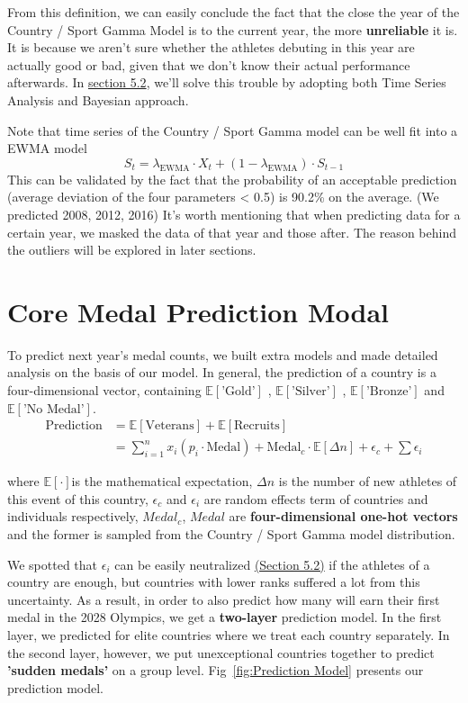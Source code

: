 \documentclass{mcmthesis}
\begin{document}
From this definition, we can easily conclude the fact that the close the year of the Country / Sport Gamma Model is to the current year, the more \textbf{unreliable} it is. It is because we aren't sure whether the athletes debuting in this year are actually good or bad, given that we don't know their actual performance afterwards. In \hyperref[sec:5.2]{section 5.2}, we'll solve this trouble by adopting both Time Series Analysis and Bayesian approach.

Note that time series of the Country / Sport Gamma model can be well fit into a EWMA model\cite{5}\cite{6}$$S_t = \lambda_{\text{EWMA}} \cdot X_t + (1 - \lambda_{\text{EWMA}}) \cdot S_{t-1}$$This can be validated by the fact that the probability of an acceptable prediction (average deviation of the four parameters < 0.5) is 90.2\% on the average. (We predicted 2008, 2012, 2016) It's worth mentioning that when predicting data for a certain year, we masked the data of that year and those after. The reason behind the outliers will be explored in later sections.

\section{Core Medal Prediction Modal}
To predict next year's medal counts, we built extra models and made detailed analysis on the basis of our model. 
In general, the prediction of a country is a four-dimensional vector, containing 
$\mathbb{E}[\text{'Gold'}]$ , $\mathbb{E}[\text{'Silver'}]$ , $\mathbb{E}[\text{'Bronze'}]$ and $\mathbb{E}[\text{'No Medal'}]$.
\begin{align*}
    \text{Prediction} &= \mathbb{E}[\text{Veterans}] + \mathbb{E}[\text{Recruits}] \\
    &= \sum_{i=1}^{n} x_i(p_i \cdot \text{Medal}) + \text{Medal}_c \cdot \mathbb{E}[\Delta n] + \epsilon_c + \sum \epsilon_i
\end{align*}

where $\mathbb{E}[\cdot]$is the mathematical expectation, $\Delta n$ is the number of new athletes of this event of this country, $\epsilon_c$ and $\epsilon_i$ are random effects term of countries and individuals respectively, $Medal_c$, $Medal$ are \textbf{four-dimensional one-hot vectors} and the former is sampled from the Country / Sport Gamma model distribution.

We spotted that $\epsilon_i$ can be easily neutralized \hyperref[sec:5.2]{(Section 5.2)} if the athletes of a country are enough, but countries with lower ranks suffered a lot from this uncertainty. As a result, in order to also predict how many will earn their first medal in the 2028 Olympics, we get a \textbf{two-layer} prediction model. In the first layer, we predicted for elite countries where we treat each country separately. In the second layer, however, we put unexceptional countries together to predict \textbf{'sudden medals'} on a group level. Fig~\ref{fig:Prediction Model} presents our prediction model.
\end{document}
